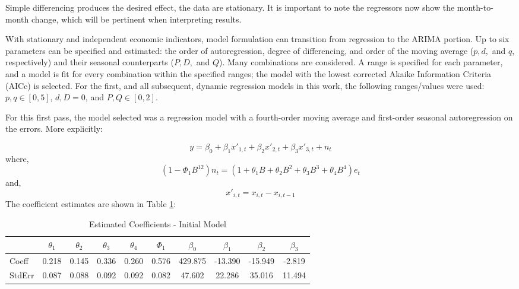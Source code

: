 \documentclass[12pt,letterpaper,toc=flat,oneside]{report}
\theoremstyle{definition}
\theoremstyle{definition}
\theoremstyle{definition}
\theoremstyle{remark}
\begin{document}
Simple differencing produces the desired effect, the data are
stationary. It is important to note the regressors now show the
month-to-month change, which will be pertinent when interpreting
results.

With stationary and independent economic indicators, model formulation
can transition from regression to the ARIMA portion. Up to six
parameters can be specified and estimated: the order of autoregression,
degree of differencing, and order of the moving average (\(p,d,\) and
\(q\), respectively) and their seasonal counterparts (\(P,D,\) and
\(Q\)). Many combinations are considered. A range is specified for each
parameter, and a model is fit for every combination within the specified
ranges; the model with the lowest corrected Akaike Information Criteria
(AICc) is selected. For the first, and all subsequent, dynamic
regression models in this work, the following ranges/values were used:
\(p,q \in [0,5]\), \(d,D = 0\), and \(P, Q \in [0,2]\).

For this first pass, the model selected was a regression model with a
fourth-order moving average and first-order seasonal autoregression on
the errors. More explicitly:

\[ y = \beta_0 + \beta_1x'_{1,t} + \beta_2x'_{2,t} + \beta_3x'_{3,t} + n_t\]
where,
\[ (1-\Phi_1 B^{12})n_t = (1 + \theta_1B + \theta_2B^2 + \theta_3B^3 + \theta_4 B^4)e_t \]
and, \[ x'_{i,t} = x_{i,t} - x_{i,t-1}\] The coefficient estimates are
shown in Table \ref{tab:dynreg1-coeff}:

\begin{table}[!h]

\caption{\label{tab:dynreg1-coeff}Estimated Coefficients - Initial Model}
\centering
\begin{tabular}[t]{lccccccccc}
\toprule
\bfseries{ } & \bfseries{$\theta_1$} & \bfseries{$\theta_2$} & \bfseries{$\theta_3$} & \bfseries{$\theta_4$} & \bfseries{$\Phi_1$} & \bfseries{$\beta_0$} & \bfseries{$\beta_1$} & \bfseries{$\beta_2$} & \bfseries{$\beta_3$}\\
\midrule
Coeff & 0.218 & 0.145 & 0.336 & 0.260 & 0.576 & 429.875 & -13.390 & -15.949 & -2.819\\
StdErr & 0.087 & 0.088 & 0.092 & 0.092 & 0.082 & 47.602 & 22.286 & 35.016 & 11.494\\
\bottomrule
\end{tabular}
\end{table}
\end{document}
